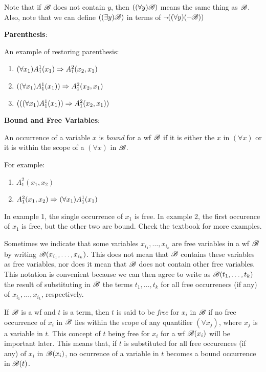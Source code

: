 \noindent
Note that if $\mathscr{B}$ does not contain $y$, then $((\forall y)\mathscr{B})$ means the same thing as $\mathscr{B}$. Also, note that we can define $((\exists y)\mathscr{B})$ in terms of $\lnot ((\forall y) (\lnot \mathscr{B}))$

\noindent
\textbf{Parenthesis}:
\par
\noindent
An example of restoring parenthesis:

\begin{enumerate}
    \item $(\forall x_1) A_1^1(x_1) \Rightarrow A_1^2(x_2,x_1)$
    \item $((\forall x_1) A_1^1(x_1)) \Rightarrow A_1^2(x_2,x_1)$
    \item $(((\forall x_1) A_1^1(x_1)) \Rightarrow A_1^2(x_2,x_1))$
\end{enumerate} 

\noindent
\textbf{Bound and Free Variables}:

\noindent
An occurrence of a variable $x$ is \textit{bound} for a wf $\mathscr{B}$ if it is either the $x$ in $(\forall x)$ or it is within the scope of a $(\forall x)$ in $\mathscr{B}$. 

\noindent
For example:
\begin{enumerate}
    \item $A_1^2(x_1,x_2)$
    \item $A_1^2(x_1,x_2) \Rightarrow (\forall x_1)A_1^1(x_1)$
\end{enumerate}

\noindent
In example 1, the single occurrence of $x_1$ is free. In example 2, the first occurence of $x_1$ is free, but the other two are bound. Check the textbook for more examples.

\noindent
Sometimes we indicate that some variables $x_{i_1}, \dots, x_{i_k}$ are free variables in a wf $\mathscr{B}$ by writing $\mathscr{B}(x_{i_1}, \dots, x_{i_k})$. This does not mean that $\mathscr{B}$ contains these variables as free variables, nor does it mean that $\mathscr{B}$ does not contain other free variables. This notation is convenient because we can then agree to write as $\mathscr{B}(t_1, \dots, t_k)$ the result of substituting in $\mathscr{B}$ the terms $t_1, \dots, t_k$ for all free occurrenecs (if any) of $x_{i_1}, \dots, x_{i_k}$, respectively.

\noindent
If $\mathscr{B}$ is a wf and $t$ is a term, then $t$ is said to be \textit{free} for $x_i$ in $\mathscr{B}$ if no free occurrence of $x_i$ in $\mathscr{B}$ lies within the scope of any quantifier $(\forall x_j)$, where $x_j$ is a variable in $t$. This concept of $t$ being free for $x_i$ for a wf $\mathscr{B}(x_i)$ will be important later. This means that, if $t$ is substituted for all free occurences (if any) of $x_i$ in $\mathscr{B}(x_i)$, no ocurrence of a variable in $t$ becomes a bound occurrence in $\mathscr{B}(t)$.

